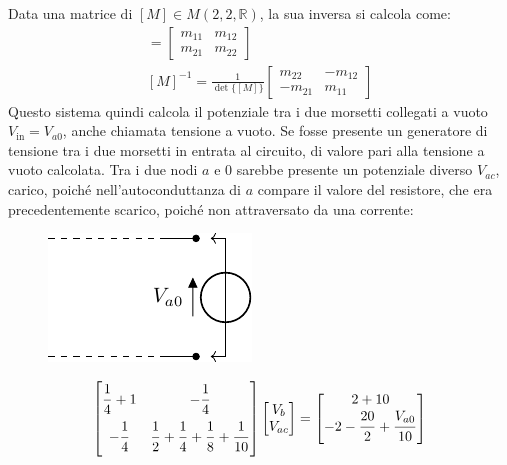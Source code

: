 \documentclass{article}
\numberwithin{equation}{subsection}
\begin{document}
Data una matrice di $[M]\in M(2,2,\mathbb{R})$, la sua inversa si calcola come:
\begin{gather*}
    [M]=\begin{bmatrix}
        m_{11}&m_{12}\\
        m_{21}&m_{22}
    \end{bmatrix}\\
    [M]^{-1}=\displaystyle\frac{1}{\det\{[M]\}}\begin{bmatrix}
        m_{22}&-m_{12}\\
        -m_{21}&m_{11}
    \end{bmatrix}
\end{gather*}
Questo sistema quindi calcola il potenziale tra i due morsetti collegati a vuoto $V_\mathrm{in}=V_{a0}$, anche chiamata tensione a vuoto. 
Se fosse presente un generatore di tensione tra i due morsetti in entrata al circuito, di valore pari alla tensione a vuoto calcolata. Tra i due nodi $a$ e $0$ sarebbe 
presente un potenziale diverso $V_{ac}$, carico, poiché nell'autoconduttanza di $a$ compare il valore del resistore, che era precedentemente scarico, poiché non attraversato 
da una corrente: 
\begin{figure}[H]%
    \centering
    \includegraphics{generatore-tensione-entrata.pdf}%
    \label{fig:generatore-tensione-entrata}
\end{figure}
\begin{gather*}
    \begin{bmatrix}
        \displaystyle\frac{\strut 1}{\strut 4}+1&-\displaystyle\frac{\strut 1}{\strut 4}\\
        \displaystyle-\frac{\strut 1}{\strut 4}&\displaystyle\frac{\strut 1}{\strut 2}+\frac{\strut 1}{\strut 4}+\frac{\strut 1}{\strut 8}+\frac{\strut 1}{\strut 10}
    \end{bmatrix}\begin{bmatrix}
        V_b\\
        V_{ac}
    \end{bmatrix}=\begin{bmatrix}
        2+10\\
        -2-\displaystyle\frac{\strut 20}{\strut 2}+\frac{\strut V_{a0}}{\strut 10}
    \end{bmatrix}
\end{gather*}
\end{document}
